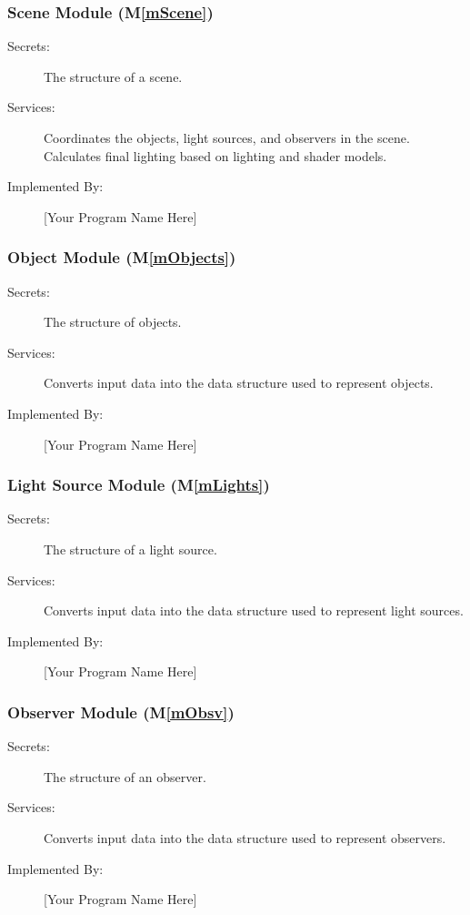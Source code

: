 \documentclass[12pt, titlepage]{article}
\newcommand{\mref}[1]{M\ref{#1}}
\begin{document}
\subsubsection{Scene Module (\mref{mScene})}
\begin{description}
	\item[Secrets:]The structure of a scene.
	\item[Services:]Coordinates the objects, light sources, and observers in 
	the scene. Calculates final lighting based on lighting and shader models.
	\item[Implemented By:] [Your Program Name Here]
\end{description}

\subsubsection{Object Module (\mref{mObjects})}
\begin{description}
	\item[Secrets:]The structure of objects.
	\item[Services:]Converts input data into the data structure used to 
	represent objects.
	\item[Implemented By:] [Your Program Name Here]
\end{description}

\subsubsection{Light Source Module (\mref{mLights})}
\begin{description}
	\item[Secrets:]The structure of a light source.
	\item[Services:]Converts input data into the data structure used to 
	represent light sources.
	\item[Implemented By:] [Your Program Name Here]
\end{description}

\subsubsection{Observer Module (\mref{mObsv})}
\begin{description}
	\item[Secrets:]The structure of an observer.
	\item[Services:]Converts input data into the data structure used to 
	represent observers.
	\item[Implemented By:] [Your Program Name Here]
\end{description}
\end{document}
